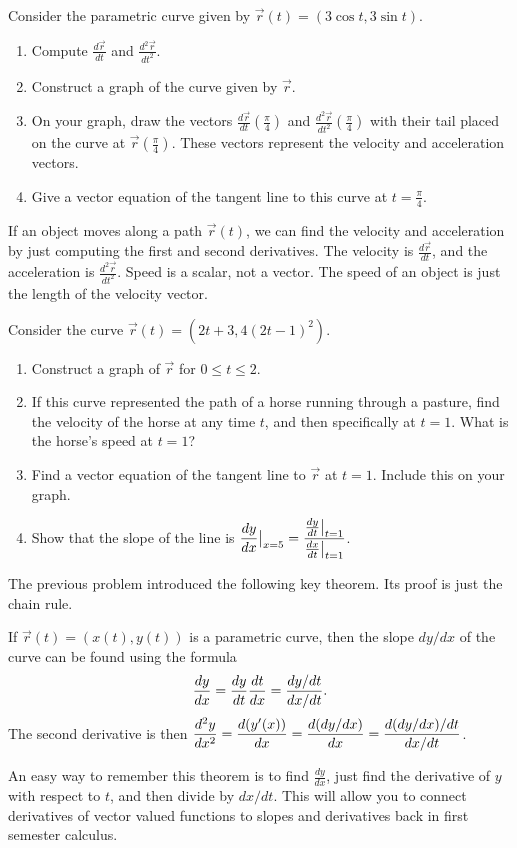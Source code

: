 \begin{problem}  
Consider the parametric curve given by $\vec r(t)=( 3\cos t, 3\sin t )$. 
\begin{enumerate}
\item Compute $\frac{d\vec r}{dt}$ and $\frac{d^2\vec r}{dt^2}$. 
\item Construct a graph of the curve given by $\vec r$.  
\item On your graph, draw the vectors $\frac{d\vec r}{dt}\left(\frac{\pi}{4}\right)$ and $\frac{d^2\vec r}{dt^2}\left(\frac{\pi}{4}\right)$ with their tail placed on the curve at $\vec r\left(\frac{\pi}{4}\right)$. These vectors represent the velocity and acceleration vectors.
\item Give a vector equation of the tangent line to this curve at $t=\frac{\pi}{4}$. 
\end{enumerate}
\end{problem}

If an object moves along a path $\vec r(t)$, we can find the velocity and acceleration by just computing the first and second derivatives. The velocity is $\frac{d\vec r}{dt}$, and the acceleration is $\frac{d^2\vec r}{dt^2}$. Speed is a scalar, not a vector. The speed of an object is just the length of the velocity vector.

\begin{problem}
Consider the curve $\vec r(t) = (2t+3, 4(2t-1)^2)$.
\begin{enumerate}
\item Construct a graph of $\vec r$ for $0\leq t\leq 2$. 
\item If this curve represented the path of a horse running through a pasture, find the velocity of the horse at any time $t$, and then specifically at $t=1$. What is the horse's speed at $t=1$?
\item Find a vector equation of the tangent line to $\vec r$ at $t=1$.  Include this on your graph.
\item Show that the slope of the line is $\displaystyle \frac{dy}{dx}\big|_{x=5} = \frac{\frac{dy}{dt}\big|_{t=1}}{\frac{dx}{dt}\big|_{t=1}}$.
\end{enumerate} 
\end{problem}

The previous problem introduced the following key theorem.  Its proof is just the chain rule.
\begin{theorem}
If $\vec r(t) = (x(t),y(t))$ is a parametric curve, then the slope $dy/dx$ of the curve can be found using the formula 
$$\displaystyle\frac{dy}{dx} = \frac{dy}{dt}\frac{dt}{dx} = \frac{dy/dt}{dx/dt}.$$
The second derivative is then $\displaystyle\frac{d^2y}{dx^2} = \frac{d(y'(x))}{dx} = \frac{d(dy/dx)}{dx}=\frac{d(dy/dx)/dt}{dx/dt}$.
\end{theorem}
An easy way to remember this theorem is to find $\frac{dy}{dx}$, just find the derivative of $y$ with respect to $t$, and then divide by $dx/dt$. This will allow you to connect derivatives of vector valued functions to slopes and derivatives back in first semester calculus.

